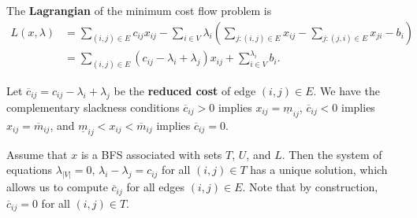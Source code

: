 \begin{defn}
  \label{sec:graphs-flows-4}
  The \textbf{Lagrangian} of the minimum cost flow problem is
  \begin{align}
    \label{eq:6}
    L(x, \lambda) &= \sum_{(i, j) \in E}^{} c_{ij} x_{ij} - \sum_{i \in
    V}^{} \lambda_{i} (\sum_{j: (i, j) \in E}^{} x_{ij} - \sum_{j: (j,
    i) \in E}^{} x_{ji} - b_{i}) \\
  &= \sum_{(i, j) \in E}^{} (c_{ij} - \lambda_{i} + \lambda_{j})
  x_{ij} + \sum_{i \in V}^{\lambda_{i}}  b_{i}.
\end{align}

Let $\overline c_{ij} = c_{ij} - \lambda_{i} + \lambda_{j}$ be the
\textbf{reduced cost} of edge $(i, j) \in E$. We have the
complementary slackness conditions $\overline c_{ij} > 0$ implies
$x_{ij} = \underline m_{ij}$, $\overline c_{ij} < 0$ implies $x_{ij} =
\overline m_{ij}$, and $\underline m_{ij} < x_{ij} < \overline m_{ij}$
implies $\overline c_{ij} = 0$.

Assume that $x$ is a BFS associated with sets $T$, $U$, and $L$.  Then
the system of equations $\lambda_{|V|} = 0$, $\lambda_{i} -
\lambda_{j} = c_{ij}$ for all $(i, j) \in T$ has a unique solution,
which allows us to compute $\overline c_{ij}$ for all edges $(i, j)
\in E$.  Note that by construction, $\overline c_{ij} = 0$ for all $(i,
j) \in T$.
\end{defn}

